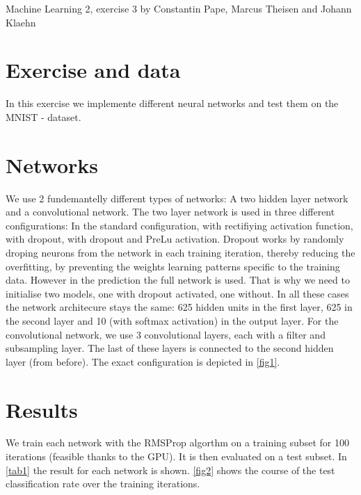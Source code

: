 \documentclass{article}
\begin{document}
Machine Learning 2, exercise 3 by Constantin Pape, Marcus Theisen and Johann Klaehn
 
\section{Exercise and data}

In this exercise we implemente different neural networks and test them on the MNIST - dataset.

\section{Networks}

We use 2 fundemantelly different types of networks:
A two hidden layer network and a convolutional network.
The two layer network is used in three different configurations:
\newline 
In the standard configuration, with rectifiying activation function, with dropout, with dropout and PreLu activation.
\newline
Dropout works by randomly droping neurons from the network in each training iteration, thereby
reducing the overfitting, by preventing the weights learning patterns specific to the training data. However in the prediction the full network is used. That is why we need to initialise two models, one with dropout activated, one without.
\newline
In all these cases the network architecure stays the same:
625 hidden units in the first layer, 625 in the second layer and 10 (with softmax activation)
in the output layer.
\newline
For the convolutional network, we use 3 convolutional layers, each with a filter and subsampling layer. The last of these layers is connected to the second hidden layer (from before). The exact configuration is depicted in \autoref{fig1}.


\section{Results}

We train each network with the RMSProp algorthm on a training subset for 100 iterations 
(feasible thanks to the GPU).
It is then evaluated on a test subset.
In \autoref{tab1} the result for each network is shown.
\autoref{fig2} shows the course of the test classification rate over the training iterations.
\end{document}
